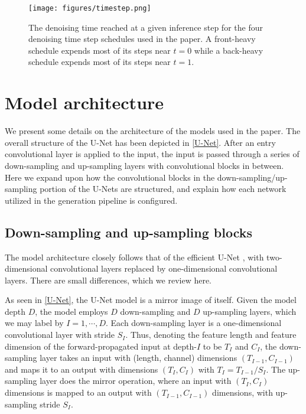 \documentclass[nohyperref]{article}
\theoremstyle{plain}
\theoremstyle{definition}
\theoremstyle{remark}
\begin{document}
\begin{figure}[h!]
\begin{center}
\centerline{
\texttt{[image: figures/timestep.png]}}
\caption{The denoising time reached at a given inference step for the four denoising time step schedules used in the paper. A front-heavy schedule expends most of its steps near $t=0$ while a back-heavy schedule expends most of its steps near $t=1$.}
\label{figure:dn}
\end{center}
\vskip -0.2in
\end{figure}


\section{Model architecture}
\label{app:architecture}

We present some details on the architecture of the models used in the paper. The overall structure of the U-Net has been depicted in \cref{U-Net}. After an entry convolutional layer is applied to the input, the input is passed through a series of down-sampling and up-sampling layers with convolutional blocks in between. Here we expand upon how the convolutional blocks in the down-sampling/up-sampling portion of the U-Nets are structured, and explain how each network utilized in the generation pipeline is configured.

\subsection{Down-sampling and up-sampling blocks}

The model architecture closely follows that of the efficient U-Net \cite{saharia2022photorealistic}, with two-dimensional convolutional layers replaced by one-dimensional convolutional layers. There are small differences, which we review here.

As seen in \cref{U-Net}, the U-Net model is a mirror image of itself. Given the model depth $D$, the model employs $D$ down-sampling and $D$ up-sampling layers, which we may label by $I = 1 , \cdots, D$. Each down-sampling layer is a one-dimensional convolutional layer with stride $S_I$. Thus, denoting the feature length and feature dimension of the forward-propagated input at depth-$I$ to be $T_I$ and $C_I$, the down-sampling layer takes an input with (length, channel) dimensions $(T_{I-1}, C_{I-1})$ and maps it to an output with dimensions $(T_I, C_I)$ with $T_I = T_{I-1}/S_I$. The up-sampling layer does the mirror operation, where an input with $(T_I, C_I)$ dimensions is mapped to an output with $(T_{I-1}, C_{I-1})$ dimensions, with up-sampling stride $S_I$.
\end{document}
